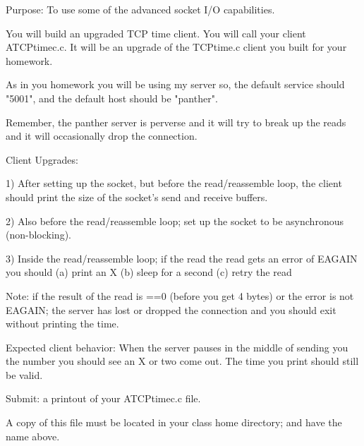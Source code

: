 

\parindent 0pt

Purpose: To use some of the advanced socket I/O capabilities.

You will build an upgraded TCP time client.
You will call your client {\ltt{}ATCPtimec.c}.
It will be an upgrade of the {\ltt{}TCPtime.c} client you built
for your homework.

As in you homework you will be using my server so,
the default service should {\ltt{}"5001"},
and the default host should be {\ltt{}"panther"}.

Remember, the {\ltt{}panther} server is perverse and it will try
to break up the reads and it will occasionally drop the connection.

Client Upgrades:

1) After setting up the socket, but before the read/reassemble loop,
the client should print the size of the socket's
send and receive buffers.

2) Also before the read/reassemble loop; set up the socket to be asynchronous
(non-blocking).

3) Inside the read/reassemble loop; if the read
the read gets an error of {\ltt{}EAGAIN} you should 
(a) print an {\ltt{}X}
(b) sleep for a second
(c) retry the read

Note: if the result of the read is {\ltt{}==0} (before you get 4 bytes)
or the error is not {\ltt{}EAGAIN}; the server has lost or dropped the
connection and you should exit without printing the time.

Expected client behavior:
When the server pauses in the middle of sending you the number
you should see an {\ltt{}X} or two come out.
The time you print should still be valid.

Submit: a printout of your {\ltt{}ATCPtimec.c} file.

A copy of this file must be located in your class home directory;
and have the name above.

\bye
